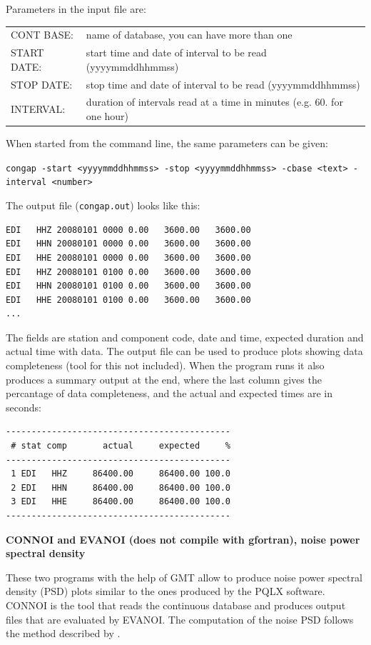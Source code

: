 Parameters in the input file are: 

\begin{tabular}{ll}
CONT BASE: & name of database, you can have more than one \\
START DATE: & start time and date of interval to be read (yyyymmddhhmmss) \\
STOP DATE: & stop time and date of interval to be read (yyyymmddhhmmss) \\
INTERVAL: & duration of intervals read at a time in minutes (e.g. 60. for one hour)\\
\end{tabular}

When started from the command line, the same parameters can be given: 

\texttt{congap -start <yyyymmddhhmmss> -stop <yyyymmddhhmmss> -cbase <text> -interval <number>}

The output file (\texttt{congap.out}) looks like this: 

\begin{verbatim}
EDI   HHZ 20080101 0000 0.00   3600.00   3600.00  
EDI   HHN 20080101 0000 0.00   3600.00   3600.00  
EDI   HHE 20080101 0000 0.00   3600.00   3600.00  
EDI   HHZ 20080101 0100 0.00   3600.00   3600.00  
EDI   HHN 20080101 0100 0.00   3600.00   3600.00  
EDI   HHE 20080101 0100 0.00   3600.00   3600.00  
...
\end{verbatim}

The fields are station and component code, date and time, expected duration and actual time with data. The output file can be used to produce plots showing data completeness (tool for this not included). When the program runs it also produces a summary output at the end, where the last column gives the percantage of data completeness, and the actual and expected times are in seconds: 

\begin{verbatim}
--------------------------------------------
 # stat comp       actual     expected     %
--------------------------------------------
 1 EDI   HHZ     86400.00     86400.00 100.0  
 2 EDI   HHN     86400.00     86400.00 100.0  
 3 EDI   HHE     86400.00     86400.00 100.0  
--------------------------------------------
\end{verbatim}

\textbf{CONNOI and EVANOI (does not compile with gfortran), noise power spectral density}

These two programs with the help of GMT allow to produce noise power spectral
density (PSD) plots similar to the ones produced by the PQLX software. CONNOI is the
tool that reads the continuous database and produces output files that are evaluated 
by EVANOI. The computation of the noise PSD follows the method described by
\citet{mcnamara2004}.

